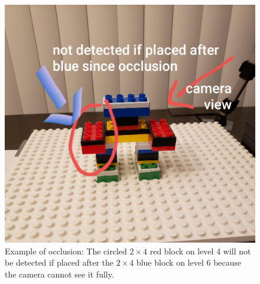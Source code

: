 \begin{figure}[h]
   \centering
   \includegraphics[scale=0.2]{figures/occlusion.jpg}
   \caption[{Example of occlusion}]{Example of occlusion: The circled $2 \times 4$ red block on level 4 will not be detected if placed after the $2 \times 4$ blue block on level 6 because the camera cannot see it fully.}
   \label{fig:fig_3-4}
\end{figure}

